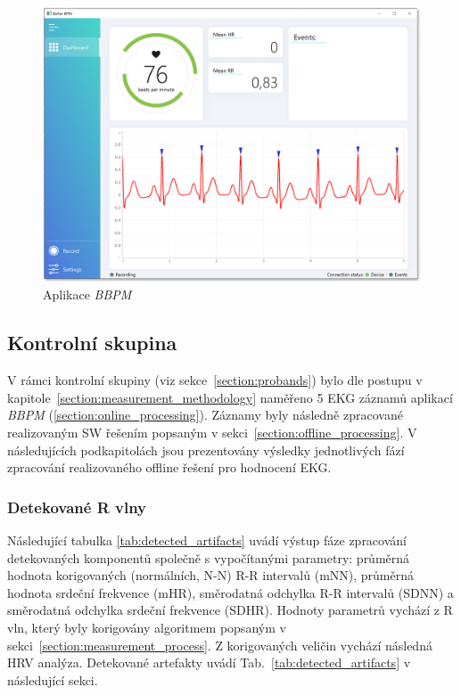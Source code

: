 \begin{figure}[H]
	\begin{center}
		\includegraphics[width=1\textwidth]{../assets/bbpm/bbpm_app}
		\caption{Aplikace \textit{BBPM}}
		\label{fig:results_bbpm}
	\end{center}
\end{figure}

\clearpage

\subsection{Kontrolní skupina}
\label{sections:results_probands}
V rámci kontrolní skupiny (viz sekce~\ref{section:probands}) bylo dle postupu v
kapitole~\ref{section:measurement_methodology} naměřeno 5 EKG záznamů aplikací
\textit{BBPM} (\ref{section:online_processing}). Záznamy byly následně
zpracované realizovaným SW řešením popsaným v
sekci~\ref{section:offline_processing}. V následujících podkapitolách jsou
prezentovány výsledky jednotlivých fází zpracování realizovaného offline řešení
pro hodnocení EKG.

\subsubsection{Detekované R vlny}
Následující tabulka \ref{tab:detected_artifacts} uvádí výstup fáze zpracování
detekovaných komponentů společně s vypočítanými parametry: průměrná hodnota
korigovaných (normálních, N-N) R-R intervalů (mNN), průměrná hodnota srdeční
frekvence (mHR), směrodatná odchylka R-R intervalů (SDNN) a směrodatná odchylka
srdeční frekvence (SDHR). Hodnoty parametrů vychází z R vln, který byly
korigovány algoritmem popsaným v sekci~\ref{section:measurement_process}. Z
korigovaných veličin vychází následná HRV analýza. Detekované artefakty uvádí
Tab.~\ref{tab:detected_artifacts} v následující sekci.

